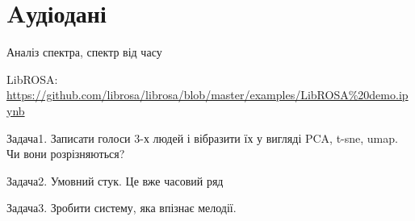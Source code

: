 \section{Aудіодані}

Аналіз спектра, спектр від часу

LibROSA: \url{https://github.com/librosa/librosa/blob/master/examples/LibROSA\%20demo.ipynb}

Задача1. Записати голоси 3-х людей і вібразити їх у вигляді PCA, t-sne, umap. Чи вони розрізняються?

Задача2. Умовний стук. Це вже часовий ряд

Задача3. Зробити систему, яка впізнає мелодії.

